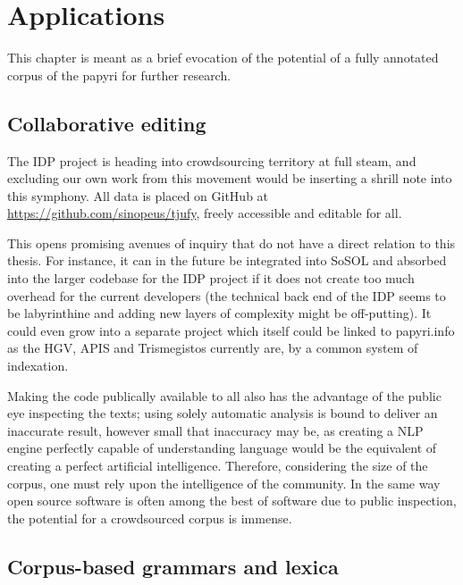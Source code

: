 \chapter{Applications} %
\label{cha:applications}

This chapter is meant as a brief evocation of the potential of a fully
annotated corpus of the papyri for further research.

\section{Collaborative editing} %
\label{sec:collaborativeediting}

The IDP project is heading into crowdsourcing territory at full steam, and
excluding our own work from this movement would be inserting a shrill note into
this symphony. All data is placed on GitHub at
\url{https://github.com/sinopeus/tjufy}, freely accessible and editable for
all. 

This opens promising avenues of inquiry that do not have a direct relation
to this thesis. For instance, it can in the future be integrated into SoSOL and
absorbed into the larger codebase for the IDP project if it does not create too
much overhead for the current developers (the technical back end of the IDP
seems to be labyrinthine and adding new layers of complexity might be
off-putting). It could even grow into a separate project which itself could be
linked to papyri.info as the HGV, APIS and Trismegistos currently are, by a
common system of indexation.

Making the code publically available to all also has the advantage of the
public eye inspecting the texts; using solely automatic analysis is bound to
deliver an inaccurate result, however small that inaccuracy may be, as creating
a NLP engine perfectly capable of understanding language would be the
equivalent of creating a perfect artificial intelligence. Therefore,
considering the size of the corpus, one must rely upon the intelligence of the
community. In the same way open source software is often among the best of
software due to public inspection, the potential for a crowdsourced corpus is
immense.


\section{Corpus-based grammars and lexica} %
\label{sec:corpusbasedgrammars}

